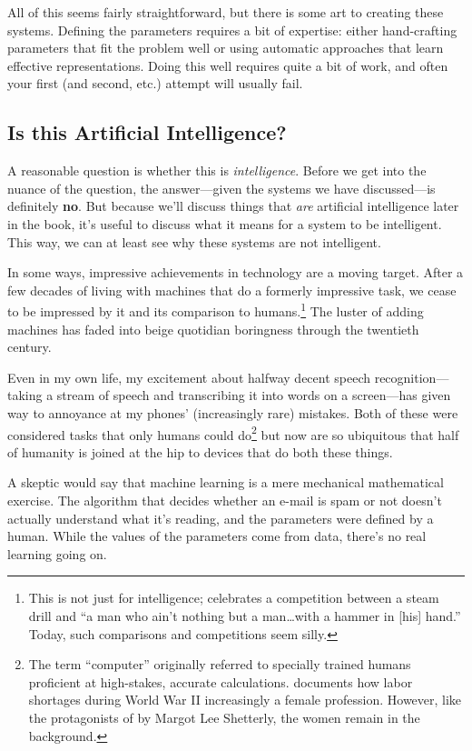 All of this seems fairly straightforward, but there is some art to
creating these systems.  Defining the parameters requires a bit of
expertise: either hand-crafting parameters that fit the problem well
or using automatic approaches that learn effective representations.
Doing this well requires quite a bit of work, and often your first
(and second, etc.) attempt will usually fail.

\subsection{Is this Artificial Intelligence?}

A reasonable question is whether this is \emph{intelligence}.  Before
we get into the nuance of the question, the answer---given the systems
we have discussed---is definitely \textbf{no}.  But because we'll
discuss things that \emph{are} artificial intelligence later in the
book, it's useful to discuss what it means for a system to be
intelligent.  This way, we can at least see why these systems are
not intelligent.

In some ways, impressive achievements in technology are a moving
target.  After a few decades of living with machines that do a
formerly impressive task, we cease to be impressed by it and its
comparison to humans.\footnote{This is not just for intelligence;
   celebrates a competition between a
  steam drill and ``a man who ain't nothing but a man\dots with a
  hammer in [his] hand.''  Today, such comparisons and competitions
  seem silly.}  The luster of adding machines has faded into beige
quotidian boringness through the twentieth century.

Even in my own life, my excitement about halfway decent speech
recognition---taking a stream of speech and transcribing it into words
on a screen---has given way to annoyance at my phones' (increasingly
rare) mistakes.  Both of these were considered tasks that only humans
could do\footnote{The term ``computer'' originally referred to
  specially trained humans proficient at high-stakes, accurate
  calculations.  \citet{light-99} documents how labor shortages during
  World War II increasingly a female profession.  However, like the
  protagonists of  by Margot Lee Shetterly, the
  women remain in the background.} but now are so ubiquitous that half
of humanity is joined at the hip to devices that do both these things.

A skeptic would say that machine learning is a mere mechanical
mathematical exercise.  The algorithm that decides whether an e-mail
is spam or not doesn't actually understand what it's reading, and the
parameters were defined by a human.  While the values of the
parameters come from data, there's no real learning going on.

